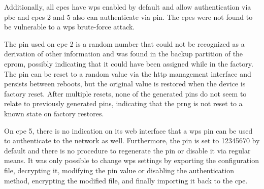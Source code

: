 Additionally, all \glspl{cpe} have \gls{wps} enabled by default and allow authentication via \gls{pbc} and \glspl{cpe} 2 and 5 also can authenticate via \gls{pin}. The \glspl{cpe} were not found to be vulnerable to a \gls{wps} brute-force attack.

The \gls{pin} used on \gls{cpe} 2 is a random number that could not be recognized as a derivation of other information and was found in the backup partition of the \gls{eprom}, possibly indicating that it could have been assigned while in the factory. The \gls{pin} can be reset to a random value via the \gls{http} management interface and persists between reboots, but the original value is restored when the device is factory reset. After multiple resets, none of the generated \glspl{pin} do not seem to relate to previously generated \gls{pin}s, indicating that the \gls{prng} is not reset to a known state on factory restores.

On \gls{cpe} 5, there is no indication on its web interface that a \gls{wps} \gls{pin} can be used to authenticate to the network as well. Furthermore, the \gls{pin} is set to 12345670 by default and there is no procedure to regenerate the \gls{pin} or disable it via regular means. It was only possible to change \gls{wps} settings by exporting the configuration file, decrypting it, modifying the \gls{pin} value or disabling the authentication method, encrypting the modified file, and finally importing it back to the \gls{cpe}.

\FloatBarrier
